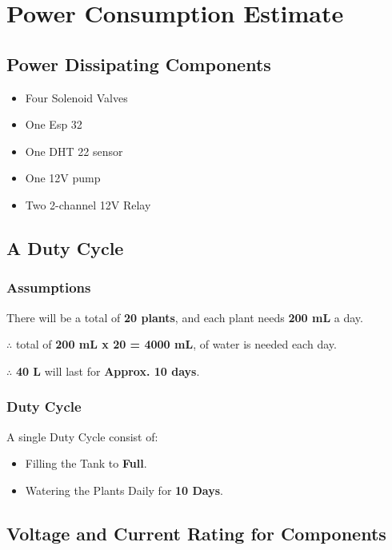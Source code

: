\documentclass[../main.tex]{subfiles}
\begin{document}
\chapter{Power Consumption Estimate}

\section{Power Dissipating Components}

\begin{itemize}
    \item Four Solenoid Valves
    \item One Esp 32
    \item One DHT 22 sensor
    \item One 12V pump
    \item Two 2-channel 12V Relay
\end{itemize}

\section{A Duty Cycle}

\subsection{Assumptions}

There will be a total of \textbf{20 plants}, and each plant needs \textbf{200 mL} a day.

$\therefore$ total of \textbf{200 mL x 20 = 4000 mL}, of water is needed each day.

$\therefore$ \textbf{40 L} will last for \textbf{Approx. 10 days}.

\subsection{Duty Cycle}

A single Duty Cycle consist of:

\begin{itemize}
    \item Filling the Tank to \textbf{Full}.
    \item Watering the Plants Daily for \textbf{10 Days}.
\end{itemize}

\section{Voltage and Current Rating for Components}
\end{document}
